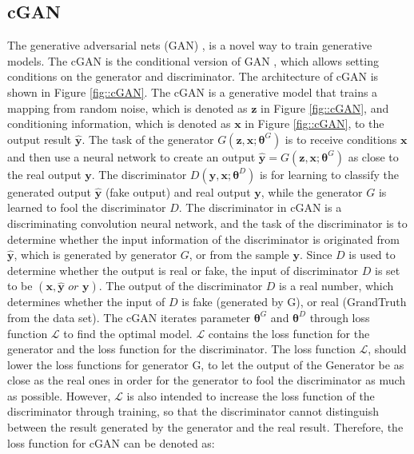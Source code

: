 \documentclass{article}
\begin{document}
\subsection{cGAN\label{Sec::cGANIntro}}
The generative adversarial nets (GAN) \cite{1-1-GAN-goodfellow2014generative}, is a novel way to train generative models. The cGAN is the conditional version of GAN \cite{1-2-cGAN-mirza2014conditional}, which allows setting conditions on the generator and discriminator. The architecture of cGAN is shown in Figure \ref{fig::cGAN}. The cGAN is a generative model that trains a mapping from random noise, which is denoted as $\boldsymbol{z}$ in Figure \ref{fig::cGAN}, and conditioning information, which is denoted as $\boldsymbol{x}$ in Figure \ref{fig::cGAN}, to the output result $\boldsymbol{\hat{y}}$.  The task of the generator $G(\boldsymbol{z}, \boldsymbol{x}; \boldsymbol{\theta}^G)$ is to receive conditions $\boldsymbol{x}$ and then use a neural network to create an output $\boldsymbol{\hat{y}} = G(\boldsymbol{z}, \boldsymbol{x}; \boldsymbol{\theta}^G)$ as close to the real output $\boldsymbol{y}$.
The discriminator $D(\boldsymbol{y}, \boldsymbol{x}; \boldsymbol{\theta}^D)$ is for learning to classify the generated output $\boldsymbol{\hat{y}}$ (fake output) and real output $\boldsymbol{y}$, while the generator $G$ is learned to fool the discriminator $D$. The discriminator in cGAN is a discriminating convolution neural network, and the task of the discriminator is to determine whether the input information of the discriminator is originated from $\boldsymbol{\hat{y}}$, which is generated by generator $G$, or from the sample $\boldsymbol{y}$. Since $D$ is used to determine whether the output is real or fake, the input of discriminator $D$ is set to be $(\boldsymbol{x}, \boldsymbol{\hat{y}} \textit{ or } \boldsymbol{y})$. The output of the discriminator $D$ is a real number, which determines whether the input of $D$ is fake (generated by G), or real (GrandTruth from the data set).
The cGAN iterates parameter $\boldsymbol{\theta}^G$ and $\boldsymbol{\theta}^D$ through loss function $\mathcal{L}$ to find the optimal model. $\mathcal{L}$  contains the loss function for the generator and the loss function for the discriminator. The loss function $\mathcal{L}$, should lower the loss functions for generator G, to let the output of the Generator be as close as the real ones in order for the generator to fool the discriminator as much as possible. However,  $\mathcal{L}$ is also intended to increase the loss function of the discriminator through training, so that the discriminator cannot distinguish between the result generated by the generator and the real result.  Therefore, the loss function for cGAN can be denoted as:
\end{document}
